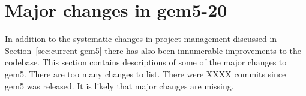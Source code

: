 \section{Major changes in gem5-20}
\label{sec:changes}

In addition to the systematic changes in project management discussed in Section~\ref{sec:current-gem5} there has also been innumerable improvements to the codebase.
This section contains descriptions of some of the major changes to gem5.
There are too many changes to list.
There were XXXX commits since gem5 was released.
It is likely that major changes are missing.

































